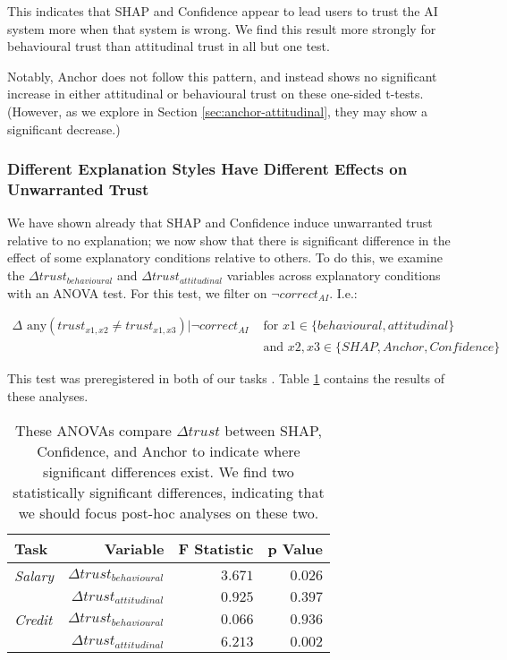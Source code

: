 This indicates that SHAP and Confidence appear to lead users to trust the AI system more when that system is wrong. We find this result more strongly for behavioural trust than attitudinal trust in all but one test.

Notably, Anchor does not follow this pattern, and instead shows no significant increase in either attitudinal or behavioural trust on these one-sided t-tests. (However, as we explore in Section \ref{sec:anchor-attitudinal}, they may show a significant decrease.)

\subsubsection{Different Explanation Styles Have Different Effects on Unwarranted Trust}
We have shown already that SHAP and Confidence induce unwarranted trust relative to no explanation; we now show that there is significant difference in the effect of some explanatory conditions relative to others. To do this, we examine the $\Delta trust_{behavioural}$ and $\Delta trust_{attitudinal}$ variables across explanatory conditions with an ANOVA test. For this test, we filter on $\neg correct_{AI}$. I.e.:

\begin{equation}
    \begin{split}
        \Delta \text{ any}(trust_{x1,x2} \neq trust_{x1,x3}) | \neg correct_{AI} & \text{ for } x1 \in \{behavioural, attitudinal\} \\
        & \text{ and } x2,x3 \in \{SHAP, Anchor, Confidence\}
    \end{split}
\end{equation}

\noindent This test was preregistered in both of our tasks \cite{natarajan_binns_2022}. Table \ref{tab:delta-trust-anova} contains the results of these analyses.

\begin{table}[htb]
    \centering
    \caption{These ANOVAs compare $\Delta trust$ between SHAP, Confidence, and Anchor to indicate where significant differences exist. We find two statistically significant differences, indicating that we should focus post-hoc analyses on these two.}
    \label{tab:delta-trust-anova}
    \begin{tabular}{lrrr}
        \toprule
        Task & Variable & F Statistic & p Value \\
        \midrule
        \emph{Salary} & $\Delta trust_{behavioural}$ & $\mathbf{3.671}$ & $\mathbf{0.026}$ \\
        & $\Delta trust_{attitudinal}$ & $0.925$ & $0.397$ \\
        \midrule
        \emph{Credit} & $\Delta trust_{behavioural}$ & $0.066$ & $0.936$ \\
        & $\Delta trust_{attitudinal}$ & $\mathbf{6.213}$ & $\mathbf{0.002}$ \\
        \bottomrule
    \end{tabular}
\end{table}

